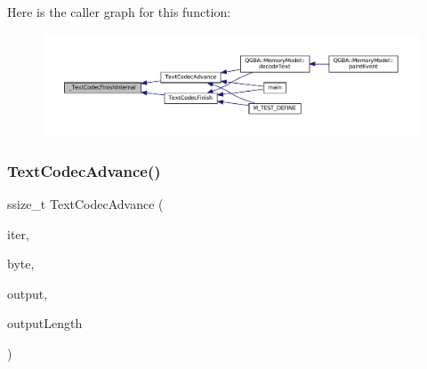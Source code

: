Here is the caller graph for this function\+:
\nopagebreak
\begin{figure}[H]
\begin{center}
\leavevmode
\includegraphics[width=350pt]{text-codec_8c_ac88972a459e050dd63076e077babffd0_icgraph}
\end{center}
\end{figure}
\mbox{\label{text-codec_8c_a7090f20c2a664b7bf30416d0275e6b25}} 
\subsubsection{\texorpdfstring{Text\+Codec\+Advance()}{TextCodecAdvance()}}
{\footnotesize\ttfamily ssize\+\_\+t Text\+Codec\+Advance (\begin{DoxyParamCaption}\item[{struct Text\+Codec\+Iterator $\ast$}]{iter,  }\item[{uint8\+\_\+t}]{byte,  }\item[{uint8\+\_\+t $\ast$}]{output,  }\item[{size\+\_\+t}]{output\+Length }\end{DoxyParamCaption})}

